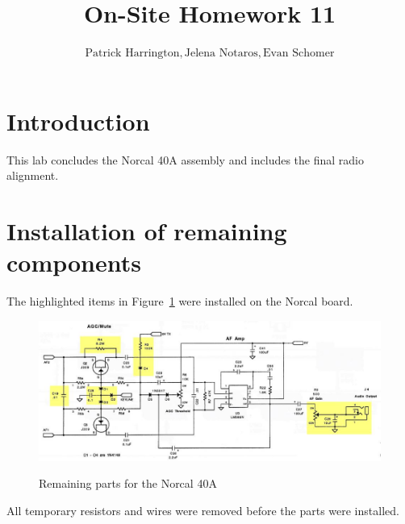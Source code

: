 \documentclass{./cls/hw}
\title{On-Site Homework 11}
\author{$\boxed{\text{Patrick Harrington}}, \boxed{\text{Jelena Notaros}}, \boxed{\text{Evan Schomer}}$}
\begin{document}
\maketitle
\section*{Introduction}
This lab concludes the Norcal 40A assembly and includes the final radio
alignment.
\section{Installation of remaining components}
  The highlighted items in Figure~\ref{fig:f} were installed on the Norcal
  board.
  \begin{figure}[h!]
    \centering
    \includegraphics[scale=.5]{./img/final.png}
    \label{fig:f}
    \caption{Remaining parts for the Norcal 40A}
  \end{figure}
  All temporary resistors and wires were removed before the parts were
  installed. 
\end{document}
